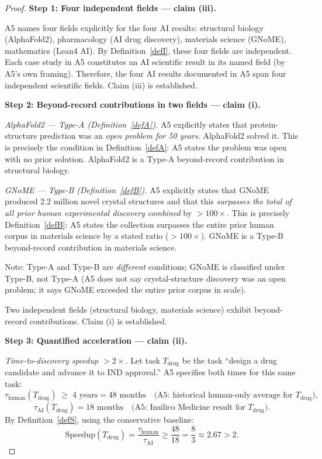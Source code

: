 \begin{proof}

\noindent\textbf{Step 1: Four independent fields — claim (iii).}

A5 names four fields explicitly for the four AI results:
structural biology (AlphaFold2),
pharmacology (AI drug discovery),
materials science (GNoME),
mathematics (Lean4 AI).
By Definition~\ref{defI}, these four fields are independent.
Each case study in A5 constitutes an AI scientific result in its named
field (by A5's own framing).
Therefore, the four AI results documented in A5 span four independent
scientific fields.  Claim (iii) is established.

\medskip
\noindent\textbf{Step 2: Beyond-record contributions in two fields — claim (i).}

\emph{AlphaFold2 — Type-A (Definition~\ref{defA}).}
A5 explicitly states that protein-structure prediction was an
\emph{open problem for 50 years}.  AlphaFold2 solved it.  This is
precisely the condition in Definition~\ref{defA}: A5 states the problem
was open with no prior solution.  AlphaFold2 is a Type-A beyond-record
contribution in structural biology.

\emph{GNoME — Type-B (Definition~\ref{defB}).}
A5 explicitly states that GNoME produced 2.2 million novel crystal
structures and that this \emph{surpasses the total of all prior human
experimental discovery combined} by $>100\times$.  This is precisely
Definition~\ref{defB}: A5 states the collection surpasses the entire
prior human corpus in materials science by a stated ratio ($>100\times$).
GNoME is a Type-B beyond-record contribution in materials science.

Note: Type-A and Type-B are \emph{different} conditions; GNoME is
classified under Type-B, not Type-A (A5 does not say crystal-structure
discovery was an open problem; it says GNoME exceeded the entire prior
corpus in scale).

Two independent fields (structural biology, materials science) exhibit
beyond-record contributions.  Claim (i) is established.

\medskip
\noindent\textbf{Step 3: Quantified acceleration — claim (ii).}

\emph{Time-to-discovery speedup $>2\times$.}
Let task $T_{\mathrm{drug}}$ be the task ``design a drug candidate and
advance it to IND approval.''  A5 specifies both times for this same task:
\[
  \tau_{\mathrm{human}}(T_{\mathrm{drug}}) \;\geq\; 4\text{ years}
    = 48\text{ months}
  \quad\text{(A5: historical human-only average for } T_{\mathrm{drug}}\text{)},
\]
\[
  \tau_{\mathrm{AI}}(T_{\mathrm{drug}}) = 18\text{ months}
  \quad\text{(A5: Insilico Medicine result for } T_{\mathrm{drug}}\text{)}.
\]
By Definition~\ref{defS}, using the conservative baseline:
\[
  \text{Speedup}(T_{\mathrm{drug}})
  = \frac{\tau_{\mathrm{human}}}{\tau_{\mathrm{AI}}}
  \geq \frac{48}{18} = \frac{8}{3} \approx 2.67 > 2.
\]


\end{proof}
